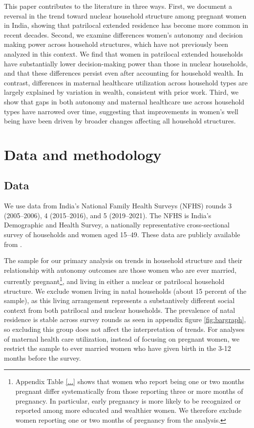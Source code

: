 \documentclass[12pt]{article}
\begin{document}
This paper contributes to the literature in three ways. First, we document a reversal in the trend toward nuclear household structure among pregnant women in India, showing that patrilocal extended residence has become more common in recent decades. Second, we examine differences women’s autonomy and decision making power across household structures, which have not previously been analyzed in this context. We find that women in patrilocal extended households have substantially lower decision-making power than those in nuclear households, and that these differences persist even after accounting for household wealth. In contrast, differences in maternal healthcare utilization across household types are largely explained by variation in wealth, consistent with prior work. Third, we show that gaps in both autonomy and maternal healthcare use across household types have narrowed over time, suggesting that improvements in women’s well being have been driven by broader changes affecting all household structures.

\section{Data and methodology}
\subsection{Data}

We use data from India’s National Family Health Surveys (NFHS) rounds 3 (2005–2006), 4 (2015–2016), and 5 (2019–2021). The NFHS is India’s Demographic and Health Survey, a nationally representative cross-sectional survey of households and women aged 15–49. These data are publicly available from .

The sample for our primary analysis on trends in household structure and their relationship with autonomy outcomes are those women who are ever married, currently pregnant\footnote{Appendix Table \ref{...} shows that women who report being one or two months pregnant differ systematically from those reporting three or more months of pregnancy. In particular, early pregnancy is more likely to be recognized or reported among more educated and wealthier women. We therefore exclude women reporting one or two months of pregnancy from the analysis.}, and living in either a nuclear or patrilocal household structure. We exclude women living in natal households (about 15 percent of the sample), as this living arrangement represents a substantively different social context from both patrilocal and nuclear households. The prevalence of natal residence is stable across survey rounds as seen in appendix figure \ref{fig:bargraph}, so excluding this group does not affect the interpretation of trends. For analyses of maternal health care utilization, instead of focusing on pregnant women, we restrict the sample to ever married women who have given birth in the 3-12 months before the survey.
\end{document}
